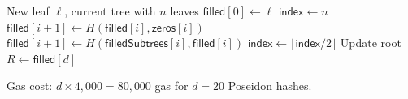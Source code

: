 \begin{algorithm}[H]
\caption{Incremental Merkle Tree Insert}
\label{alg:merkle}
\begin{algorithmic}[1]
\Require New leaf $\ell$, current tree with $n$ leaves
\State $\mathsf{filled}[0] \gets \ell$
\State $\mathsf{index} \gets n$
        \State $\mathsf{filled}[i+1] \gets H(\mathsf{filled}[i], \mathsf{zeros}[i])$
    \Else
        \State $\mathsf{filled}[i+1] \gets H(\mathsf{filledSubtrees}[i], \mathsf{filled}[i])$
    \EndIf
    \State $\mathsf{index} \gets \lfloor \mathsf{index} / 2 \rfloor$
\EndFor
\State Update root $R \gets \mathsf{filled}[d]$
\end{algorithmic}
\end{algorithm}

Gas cost: $d \times 4{,}000 = 80{,}000$ gas for $d = 20$ Poseidon hashes.

